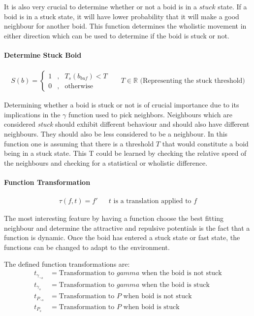 \documentclass[12pt]{article}
\begin{document}
It is also very crucial to determine whether or not a boid is in a \(stuck\) state. If a boid is in a stuck state, it will have lower probability that it will make a good neighbour for another boid. This function determines the wholistic movement in either direction which can be used to determine if the boid is stuck or not.

\paragraph{Determine Stuck Boid}
\begin{align*}
S(b) = \left\{ \begin{array}{rcl} 1 & , & T_s(b_{buf}) < T \\ 0 & , & \mbox{otherwise} \end{array}\right. && T \in \mathbb{R} \text{  (Representing the stuck threshold)}
\end{align*}

Determining whether a boid is stuck or not is of crucial importance due to its implications in the \(\gamma\) function used to pick neighbors. Neighbours which are considered \textit{stuck} should exhibit different behaviour and should also have different neighbours. They should also be less considered to be a neighbour. In this function one is assuming that there is a threshold \(T\) that would constitute a boid being in a stuck state. This T could be learned by checking the relative speed of the neighbours and checking for a statistical or wholistic difference. 
\paragraph{Function Transformation}
\begin{align*}
\tau(f, t) = f \prime && t \text{ is a translation applied to } f
\end{align*}

The most interesting feature by having a function choose the best fitting neighbour and determine the attractive and repulsive potentials is the fact that a function is dynamic. Once the boid has entered a stuck state or fast state, the functions can be changed to adapt to the environment. 

The defined function transformations are:
\begin{align*}
t_{\gamma_{\neg s}} &= \text{Transformation to \(gamma\) when the boid is not stuck} \\
t_{\gamma_s} &= \text{Transformation to \(gamma\) when the boid is stuck} \\
t_{P_{\neg s}} &= \text{Transformation to \(P\) when boid is not stuck} \\
t_{P_s} &= \text{Transformation to \(P\) when boid is stuck}
\end{align*}
\end{document}
